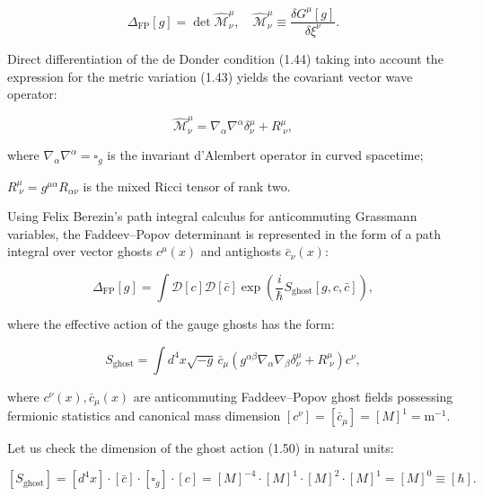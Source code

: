 \begin{equation}\label{eq:1.46}\tag{1.46}
\Delta_{\text{FP}}[g] = \det \hat{\mathcal{M}}^\mu_\nu, \quad \hat{\mathcal{M}}^\mu_\nu \equiv \frac{\delta G^\mu[g]}{\delta \xi^\nu}.
\end{equation}

Direct differentiation of the de Donder condition (1.44) taking into account the expression for the metric variation (1.43) yields the covariant vector wave operator:

\begin{equation}\label{eq:1.47}\tag{1.47}
\hat{\mathcal{M}}^\mu_\nu = \nabla_\alpha \nabla^\alpha \delta^\mu_\nu + R^\mu_{\;\nu},
\end{equation}

where $\nabla_\alpha \nabla^\alpha = \square_g$ is the invariant d'Alembert operator in curved spacetime;  

$R^\mu_{\;\nu} = g^{\mu\alpha} R_{\alpha\nu}$ is the mixed Ricci tensor of rank two.

Using Felix Berezin's path integral calculus for anticommuting Grassmann variables, the Faddeev--Popov determinant is represented in the form of a path integral over vector ghosts $c^\mu(x)$ and antighosts $\bar{c}_\nu(x)$:

\begin{equation}\label{eq:1.49}\tag{1.49}
\Delta_{\text{FP}}[g] = \int \mathcal{D}[c] \mathcal{D}[\bar{c}] \exp\left( \frac{i}{\hbar} S_{\text{ghost}}[g, c, \bar{c}] \right),
\end{equation}

where the effective action of the gauge ghosts has the form:

\begin{equation}\label{eq:1.50}\tag{1.50}
S_{\text{ghost}} = \int d^4x \sqrt{-g} \, \bar{c}_\mu \left( g^{\alpha\beta} \nabla_\alpha \nabla_\beta \delta^\mu_\nu + R^\mu_{\;\nu} \right) c^\nu,
\end{equation}

where $c^\nu(x), \bar{c}_\mu(x)$ are anticommuting Faddeev--Popov ghost fields possessing fermionic statistics and canonical mass dimension $[c^\nu] = [\bar{c}_\mu] = [M]^1 = \text{m}^{-1}$.

Let us check the dimension of the ghost action (1.50) in natural units:

\begin{equation}\label{eq:1.51}\tag{1.51}
[S_{\text{ghost}}] = [d^4x] \cdot [\bar{c}] \cdot [\square_g] \cdot [c] = [M]^{-4} \cdot [M]^1 \cdot [M]^2 \cdot [M]^1 = [M]^0 \equiv [\hbar].
\end{equation}

